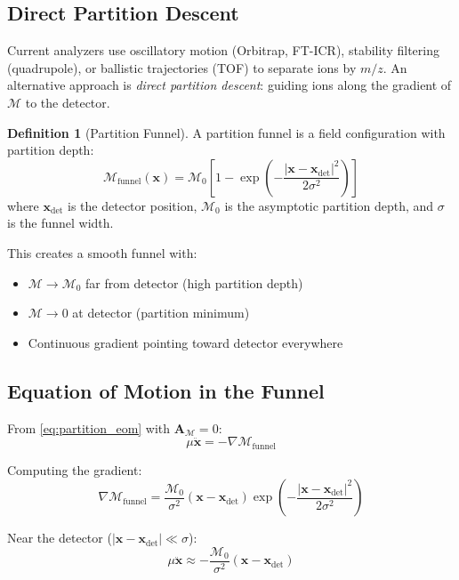 \documentclass[twocolumn,10pt,a4paper]{article}
\theoremstyle{definition}
\newtheorem{definition}[theorem]{Definition}
\theoremstyle{remark}
\newcommand{\Mdepth}{\mathcal{M}}
\newcommand{\Apartition}{\mathbf{A}_{\mathcal{M}}}
\newcommand{\partinert}{\mu}
\newcommand{\xdet}{\mathbf{x}_{\mathrm{det}}}
\begin{document}
\subsection{Direct Partition Descent}

Current analyzers use oscillatory motion (Orbitrap, FT-ICR), stability filtering (quadrupole), or ballistic trajectories (TOF) to separate ions by $m/z$. An alternative approach is \emph{direct partition descent}: guiding ions along the gradient of $\Mdepth$ to the detector.

\begin{definition}[Partition Funnel]
\label{def:funnel}
A partition funnel is a field configuration with partition depth:
\begin{equation}
    \Mdepth_{\mathrm{funnel}}(\mathbf{x}) = \Mdepth_0\left[1 - \exp\left(-\frac{|\mathbf{x} - \xdet|^2}{2\sigma^2}\right)\right]
    \label{eq:funnel_field}
\end{equation}
where $\xdet$ is the detector position, $\Mdepth_0$ is the asymptotic partition depth, and $\sigma$ is the funnel width.
\end{definition}

This creates a smooth funnel with:
\begin{itemize}
    \item $\Mdepth \to \Mdepth_0$ far from detector (high partition depth)
    \item $\Mdepth \to 0$ at detector (partition minimum)
    \item Continuous gradient pointing toward detector everywhere
\end{itemize}

\subsection{Equation of Motion in the Funnel}

From \eqref{eq:partition_eom} with $\Apartition = 0$:
\begin{equation}
    \partinert\ddot{\mathbf{x}} = -\nabla\Mdepth_{\mathrm{funnel}}
\end{equation}

Computing the gradient:
\begin{equation}
    \nabla\Mdepth_{\mathrm{funnel}} = \frac{\Mdepth_0}{\sigma^2}(\mathbf{x} - \xdet)\exp\left(-\frac{|\mathbf{x} - \xdet|^2}{2\sigma^2}\right)
\end{equation}

Near the detector ($|\mathbf{x} - \xdet| \ll \sigma$):
\begin{equation}
    \partinert\ddot{\mathbf{x}} \approx -\frac{\Mdepth_0}{\sigma^2}(\mathbf{x} - \xdet)
    \label{eq:funnel_harmonic}
\end{equation}
\end{document}

